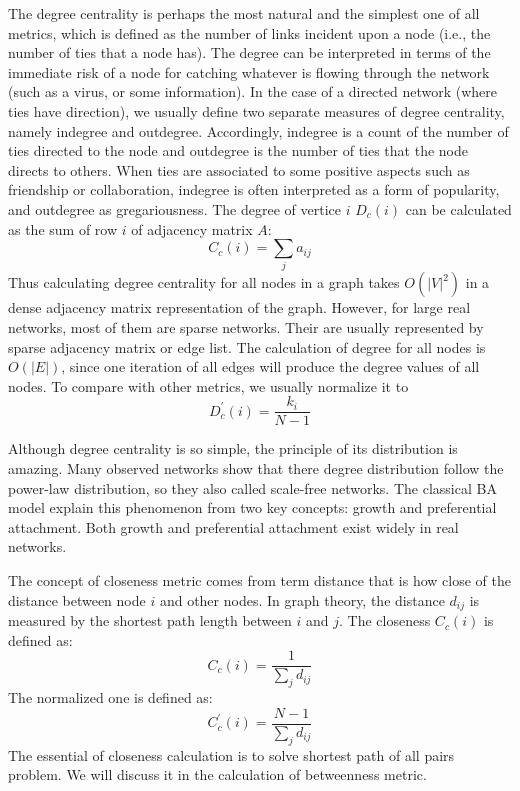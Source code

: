 \documentclass[symmetry,article,submit,moreauthors,pdftex,10pt,a4paper]{Definitions/mdpi}
\begin{document}
\begin{description}[leftmargin=0cm]
\item [(1) Degree centrality \boldmath$D_c$] The degree centrality is perhaps the most natural and the simplest one of all metrics, which is defined as the number of links incident upon a node (i.e., the number of ties that a node has). The degree can be interpreted in terms of the immediate risk of a node for catching whatever is flowing through the network (such as a virus, or some information). In the case of a directed network (where ties have direction), we usually define two separate measures of degree centrality, namely indegree and outdegree. Accordingly, indegree is a count of the number of ties directed to the node and outdegree is the number of ties that the node directs to others. When ties are associated to some positive aspects such as friendship or collaboration, indegree is often interpreted as a form of popularity, and outdegree as gregariousness. The degree of vertice $i$ $D_c(i)$ can be calculated as the sum of row $i$ of adjacency matrix $A$:
\begin{equation}
C_c(i)=\sum_ja_{ij}
\end{equation}
Thus calculating degree centrality for all nodes in a graph takes $O(|V|^2)$ in a dense adjacency matrix representation of the graph. However, for large real networks, most of them are sparse networks. Their are usually represented by sparse adjacency matrix or edge list. The calculation of degree for all nodes is $O(|E|)$, since one iteration of all edges will produce the degree values of all nodes. To compare with other metrics, we usually normalize it to
\begin{equation}
D^{'}_c(i) = \frac{k_i}{N-1}
\end{equation}

 Although degree centrality is so simple, the principle of its distribution is amazing. Many observed networks show that there degree distribution follow the power-law distribution, so they also called scale-free networks. The classical BA model explain this phenomenon from two key concepts: growth and preferential attachment. Both growth and preferential attachment exist widely in real networks.

\item [(2) Closeness centrality \boldmath$C_c$] The concept of closeness metric comes from term distance that is how close of the distance between node $i$ and other nodes. In graph theory, the distance $d_{ij}$ is measured by the shortest path length between $i$ and $j$. The closeness $C_c(i)$ is defined as:
\begin{equation}
C_c(i)=\frac{1}{\sum_jd_{ij}}
\end{equation}
The normalized one is defined as:
\begin{equation}
C^{'}_c(i)=\frac{N-1}{\sum_jd_{ij}}
\end{equation}
The essential of closeness calculation is to solve shortest path of all pairs problem. We will discuss it in the calculation of betweenness metric.


\end{description}
\end{document}
